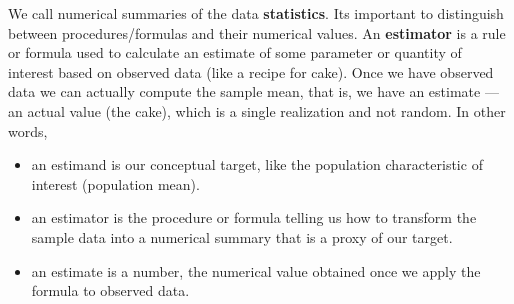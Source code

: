 \documentclass[
  11pt,
  letterpaper,
]{scrbook}
\providecommand{\tightlist}{%
  \setlength{\itemsep}{0pt}\setlength{\parskip}{0pt}}\usepackage{longtable,booktabs,array}
\theoremstyle{definition}
\theoremstyle{definition}
\theoremstyle{remark}
\begin{document}
We call numerical summaries of the data \textbf{statistics}. Its
important to distinguish between procedures/formulas and their numerical
values. An \textbf{estimator} is a rule or formula used to calculate an
estimate of some parameter or quantity of interest based on observed
data (like a recipe for cake). Once we have observed data we can
actually compute the sample mean, that is, we have an estimate --- an
actual value (the cake), which is a single realization and not random.
In other words,

\begin{itemize}
\tightlist
\item
  an estimand is our conceptual target, like the population
  characteristic of interest (population mean).
\item
  an estimator is the procedure or formula telling us how to transform
  the sample data into a numerical summary that is a proxy of our
  target.
\item
  an estimate is a number, the numerical value obtained once we apply
  the formula to observed data.
\end{itemize}
\end{document}
